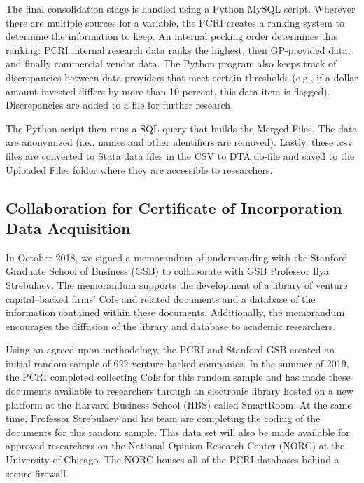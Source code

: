The final consolidation stage is handled using a Python MySQL script. Wherever there are multiple sources for a variable, the PCRI creates a ranking system to determine the information to keep. An internal pecking order determines this ranking: PCRI internal research data ranks the highest, then GP-provided data, and finally commercial vendor data. The Python program also keeps track of discrepancies between data providers that meet certain thresholds (e.g., if a dollar amount invested differs by more than 10 percent, this data item is flagged). Discrepancies are added to a file for further research.

The Python script then runs a SQL query that builds the Merged Files. The data are anonymized (i.e., names and other identifiers are removed). Lastly, these .csv files are converted to Stata data files in the CSV to DTA do-file and saved to the Uploaded Files folder where they are accessible to researchers.

\hypertarget{collaboration-for-certificate-of-incorporation-data-acquisition}{%
\subsection{Collaboration for Certificate of Incorporation Data Acquisition}\label{collaboration-for-certificate-of-incorporation-data-acquisition}}

In October 2018, we signed a memorandum of understanding with the Stanford Graduate School of Business (GSB) to collaborate with GSB Professor Ilya Strebulaev. The memorandum supports the development of a library of venture capital--backed firms' CoIs and related documents and a database of the information contained within these documents. Additionally, the memorandum encourages the diffusion of the library and database to academic researchers.

Using an agreed-upon methodology, the PCRI and Stanford GSB created an initial random sample of 622 venture-backed companies. In the summer of 2019, the PCRI completed collecting CoIs for this random sample and has made these documents available to researchers through an electronic library hosted on a new platform at the Harvard Business School (HBS) called SmartRoom. At the same time, Professor Strebulaev and his team are completing the coding of the documents for this random sample. This data set will also be made available for approved researchers on the National Opinion Research Center (NORC) at the University of Chicago. The NORC houses all of the PCRI databases behind a secure firewall.

